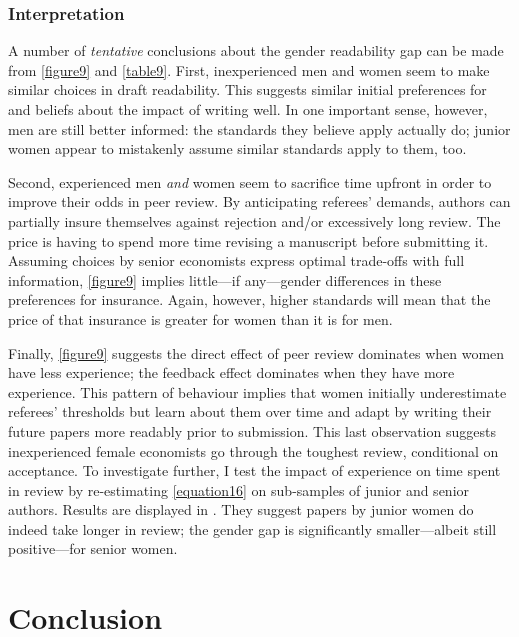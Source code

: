 

\subsubsection{Interpretation}
\label{indirecteffectinterpretation}

A number of \emph{tentative} conclusions about the gender readability gap can be made from \autoref{figure9} and \autoref{table9}. First, inexperienced men and women seem to make similar choices in draft readability. This suggests similar initial preferences for and beliefs about the impact of writing well. In one important sense, however, men are still better informed: the standards they believe apply actually do; junior women appear to mistakenly assume similar standards apply to them, too.

Second, experienced men \emph{and} women seem to sacrifice time upfront in order to improve their odds in peer review. By anticipating referees' demands, authors can partially insure themselves against rejection and\slash or excessively long review. The price is having to spend more time revising a manuscript before submitting it. Assuming choices by senior economists express optimal trade-offs with full information, \autoref{figure9} implies little---if any---gender differences in these preferences for insurance. Again, however, higher standards will mean that the price of that insurance is greater for women than it is for men.

Finally, \autoref{figure9} suggests the direct effect of peer review dominates when women have less experience; the feedback effect dominates when they have more experience. This pattern of behaviour implies that women initially underestimate referees' thresholds but learn about them over time and adapt by writing their future papers more readably prior to submission. This last observation suggests inexperienced female economists go through the toughest review, conditional on acceptance. To investigate further, I test the impact of experience on time spent in review by re-estimating \autoref{equation16} on sub-samples of junior and senior authors. Results are displayed in . They suggest papers by junior women do indeed take longer in review; the gender gap is significantly smaller---albeit still positive---for senior women.

\section{Conclusion}
\label{conclusion}

